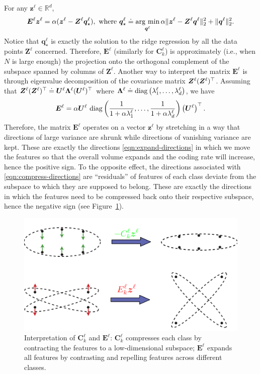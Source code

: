 \documentclass[../../book-main.tex]{subfiles}
\begin{document}
\begin{remark}\label{rem:regression-interpretation} 
For any $\bm z^\ell \in \mathbb{R}^d$,
\begin{gather}
    \bm E^\ell \bm z^\ell = \alpha(\bm z^\ell - \bm Z^\ell \bm q^\ell_\star),\
    \mbox{where}\ \bm q^\ell_\star \doteq \operatorname*{arg\ min}_{\bm q^\ell} \alpha \|\bm z^\ell - \bm Z^\ell \bm q^\ell\|_2^2 + \|\bm q^\ell\|_2^2.
\end{gather}
Notice that $\bm q^\ell_\star$ is exactly the solution to the ridge regression by all the data points $\bm Z^\ell$ concerned. Therefore, $\bm E^\ell$ (similarly for $\bm C^\ell_k$) is approximately (i.e., when $N$ is large enough) the projection onto the orthogonal complement of the subspace spanned by columns of $\bm Z^\ell$. Another way to interpret the matrix $\bm E^\ell$ is through eigenvalue decomposition of the covariance matrix $\bm{Z}^\ell (\bm{Z}^\ell)^\top$. Assuming that $\bm{Z}^\ell (\bm{Z}^\ell)^\top \doteq \bm U^\ell \bm \Lambda^\ell (\bm U^\ell)^\top$ where $\bm \Lambda^\ell \doteq \operatorname{diag}\left(\lambda^\ell_1, \ldots, \lambda^\ell_d \right)$, we have 
\begin{equation}
\bm E^\ell = \alpha \bm U^\ell\, \operatorname{diag}\left(\frac{1}{1+\alpha\lambda^\ell_1}, \ldots, \frac{1}{1+\alpha\lambda^\ell_d}\right) \left(\bm U^\ell\right)^\top.
\end{equation}
Therefore, the matrix $\bm E^\ell$ operates on a vector $\bm z^\ell$ by stretching in a way that directions of large variance are shrunk while directions of vanishing variance are kept. These are exactly the directions \eqref{eqn:expand-directions} in which we move the features so that the overall volume expands and the coding rate will increase, hence the positive sign. To the opposite effect, the directions associated with \eqref{eqn:compress-directions} are ``residuals'' of features of each class deviate from the subspace to which they are supposed to belong. These are exactly the directions in which the features need to be compressed back onto their respective subspace, hence the negative sign (see Figure~\ref{fig:regression-interpretation}). 

\begin{figure}[t]
    \centering
    \includegraphics[width=0.65\linewidth]{figs_chap4/expand_compress.png}
    \caption{\small Interpretation of $\bm C^\ell_k$ and $\bm E^\ell$: $\bm C^\ell_k$ compresses each class by contracting the features to a low-dimensional subspace; $\bm E^\ell$ expands all features by contrasting and repelling features across different classes.}
    \label{fig:regression-interpretation}
    \vspace{-0.1in}
\end{figure}



\end{remark}
\end{document}

